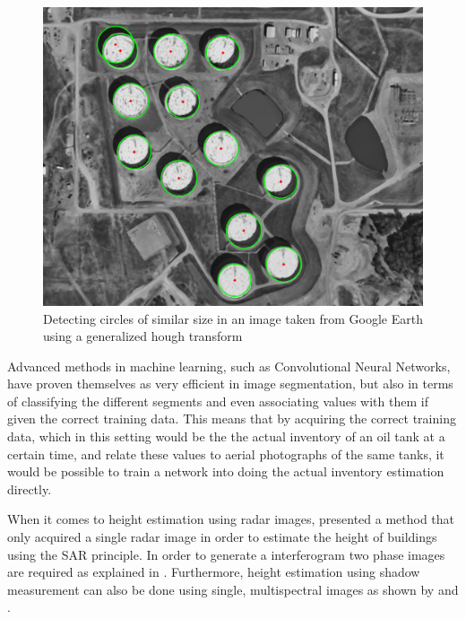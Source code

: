 \begin{figure}[!h]
	\centering
	\includegraphics[scale=0.4]{fig/hough_transform_circles.png}
	\caption{Detecting circles of similar size in an image taken from Google Earth using a generalized hough transform}
	\label{fig:houghtransformcircles}
\end{figure}

Advanced methods in machine learning, such as Convolutional Neural Networks, have proven themselves as very efficient in image segmentation, but also in terms of classifying the different segments and even associating values with them if given the correct training data. This means that by acquiring the correct training data, which in this setting would be the the actual inventory of an oil tank at a certain time, and relate these values to aerial photographs of the same tanks, it would be possible to train a network into doing the actual inventory estimation directly.

When it comes to height estimation using radar images, \cite{Brunner2008} presented a method that only acquired a single radar image in order to estimate the height of buildings using the SAR principle. In order to generate a interferogram two phase images are required as explained in \cite{Liu2015}. Furthermore, height estimation using shadow measurement can also be done using single, multispectral images as shown by \cite{Comber2012} and \cite{Shao2011}.

